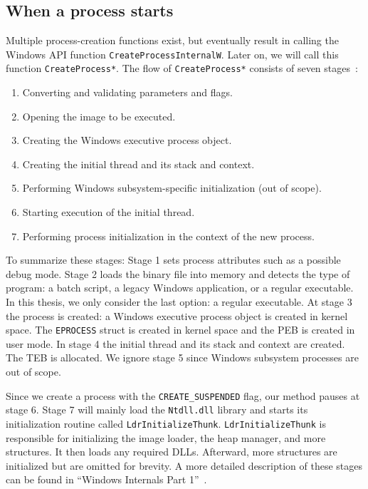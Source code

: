 \documentclass[a4paper, 11pt, english]{report}
\begin{document}
\subsection{When a process starts}
\label{sec:when-a-process-starts}
Multiple process-creation functions exist, but eventually result in calling the Windows API function \texttt{CreateProcessInternalW}. Later on, we will call this function \texttt{CreateProcess*}.
The flow of \texttt{CreateProcess*} consists of seven stages~\cite[p. 130]{windows-internals}:
\begin{enumerate}
	\item Converting and validating parameters and flags.
	\item Opening the image to be executed.
	\item Creating the Windows executive process object.
	\item Creating the initial thread and its stack and context.
	\item Performing Windows subsystem-specific initialization (out of scope).
	\item Starting execution of the initial thread.
	\item Performing process initialization in the context of the new process.
\end{enumerate}

To summarize these stages:
Stage 1 sets process attributes such as a possible debug mode. Stage 2 loads the binary file into memory and detects the type of program: a batch script, a legacy Windows application, or a regular executable. In this thesis, we only consider the last option: a regular executable. At stage 3 the process is created: a Windows executive process object is created in kernel space. The \texttt{EPROCESS} struct is created in kernel space and the PEB is created in user mode. In stage 4 the initial thread and its stack and context are created.  The TEB is allocated. We ignore stage 5 since Windows subsystem processes are out of scope.

Since we create a process with the \texttt{CREATE\_SUSPENDED} flag, our method pauses at stage 6. Stage 7 will mainly load the \texttt{Ntdll.dll} library and starts its initialization routine called \texttt{LdrInitializeThunk}. \texttt{LdrInitializeThunk} is responsible for initializing the image loader, the heap manager, and more structures. It then loads any required DLLs. Afterward, more structures are initialized but are omitted for brevity. A more detailed description of these stages can be found in ``Windows Internals Part 1''~\cite{windows-internals}. 
\end{document}

